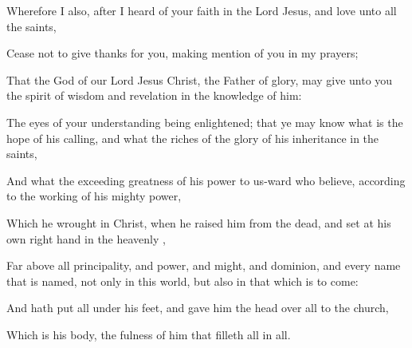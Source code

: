 {\par }{\PP {}Wherefore I
also, after I
heard
of
your
faith
in the
Lord
Jesus,
and
love
unto
all the
saints,

Cease
not to give
thanks
for
you,
making
mention of
you
in
my
prayers;

That the
God of
our
Lord
Jesus
Christ, the
Father of
glory, may
give unto
you the
spirit of
wisdom
and
revelation
in the
knowledge of
him:

The
eyes of
your
understanding being
enlightened;
that
ye may
know
what
is the
hope of
his
calling,
and
what the
riches of the
glory of
his
inheritance
in the
saints,

And
what
{} the
exceeding
greatness of
his
power
to
us-ward
who
believe, according
to the
working of
his
mighty
power,

Which he
wrought
in
Christ, when he
raised
him
from the
dead,
and
set
{}
at his
own right
hand
in the
heavenly
{},

Far
above
all
principality,
and
power,
and
might,
and
dominion,
and
every
name that is
named,
not
only
in
this
world,
but
also
in that which
is to
come:

And hath
put
all
{}
under
his
feet,
and
gave
him
{} the
head
over
all
{} to the
church,

Which
is
his
body, the
fulness of him
that
filleth
all
in
all.




\par }
